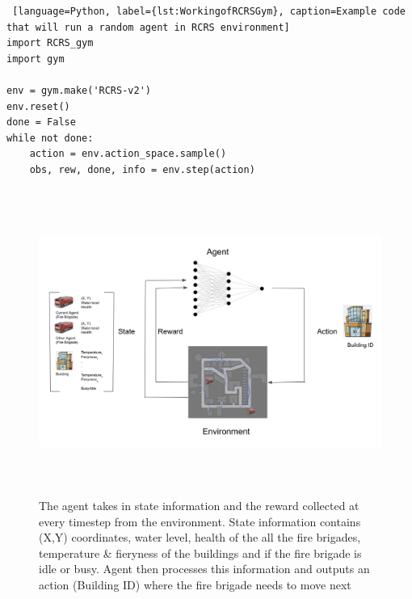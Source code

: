 \documentclass[12pt]{report}
\begin{document}


\begin{lstlisting} [language=Python, label={lst:WorkingofRCRSGym}, caption=Example code that will run a random agent in RCRS environment] 
import RCRS_gym
import gym

env = gym.make('RCRS-v2')
env.reset()
done = False
while not done:
    action = env.action_space.sample()
    obs, rew, done, info = env.step(action)

\end{lstlisting}

\begin{figure}[!h]
    \centering
    \includegraphics[height=10cm, width=17cm]{23}
    \caption{The agent takes in state information and the reward collected at every timestep from the environment. State information contains (X,Y) coordinates, water level, health of the all the fire brigades, temperature & fieryness of the buildings and if the fire brigade is idle or busy. Agent then processes this information and outputs an action (Building ID) where the fire brigade needs to move next}
    \label{fig:23}
\end{figure}
\end{document}
